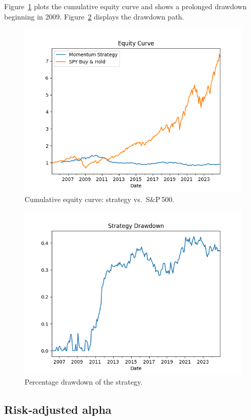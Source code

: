 \documentclass[11pt]{article}
\begin{document}
Figure~\ref{fig:eqcurve} plots the cumulative equity curve and shows a prolonged drawdown beginning in 2009.  
Figure~\ref{fig:dd} displays the drawdown path.

\begin{figure}[h!]
  \centering
  \includegraphics[width=0.85\linewidth]{figures/equity_curve.png}
  \caption{Cumulative equity curve: strategy vs.\ S\&P\,500.}
  \label{fig:eqcurve}
\end{figure}

\begin{figure}[h!]
  \centering
  \includegraphics[width=0.85\linewidth]{figures/drawdown.png}
  \caption{Percentage drawdown of the strategy.}
  \label{fig:dd}
\end{figure}

\subsection{Risk‑adjusted alpha}
\end{document}
